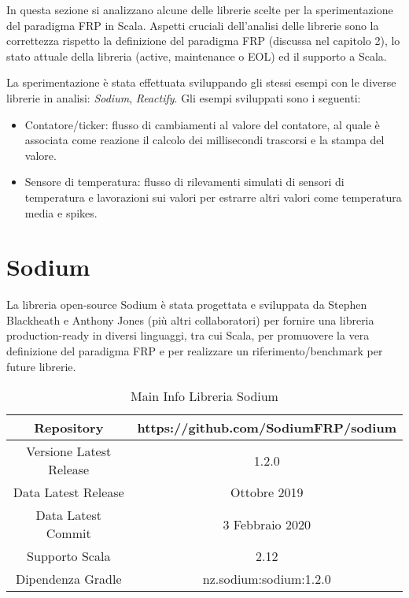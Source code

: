 \documentclass[../main.tex]{subfiles}
\begin{document}
In questa sezione si analizzano alcune delle librerie scelte per la sperimentazione del paradigma FRP in Scala. Aspetti cruciali dell'analisi delle librerie sono la correttezza rispetto la definizione del paradigma FRP (discussa nel capitolo 2), lo stato attuale della libreria (active, maintenance o EOL) ed il supporto a Scala.

La sperimentazione è stata effettuata sviluppando gli stessi esempi con le diverse librerie in analisi: \textit{Sodium}, \textit{Reactify}. Gli esempi sviluppati sono i seguenti:
\begin{itemize}
    \item Contatore/ticker: flusso di cambiamenti al valore del contatore, al quale è associata come reazione il calcolo dei millisecondi trascorsi e la stampa del valore.
    \item Sensore di temperatura: flusso di rilevamenti simulati di sensori di temperatura e lavorazioni sui valori per estrarre altri valori come temperatura media e spikes. 
\end{itemize}



\section{Sodium}
La libreria open-source Sodium è stata progettata e sviluppata da Stephen Blackheath e Anthony Jones (più altri collaboratori) per fornire una libreria production-ready in diversi linguaggi, tra cui Scala, per promuovere la vera definizione del paradigma FRP e per realizzare un riferimento/benchmark per future librerie.

\begin{table}[H]
\centering
\begin{tabular}{|c|c|}
     \hline
     Repository & https://github.com/SodiumFRP/sodium \\
     \hline
     Versione Latest Release & 1.2.0 \\
     \hline
     Data Latest Release & Ottobre 2019 \\
     \hline
     Data Latest Commit & 3 Febbraio 2020 \\
     \hline
     Supporto Scala & 2.12 \\
     \hline
     Dipendenza Gradle & nz.sodium:sodium:1.2.0 \\
     \hline
\end{tabular}
\caption{Main Info Libreria Sodium}
\end{table}
\end{document}
